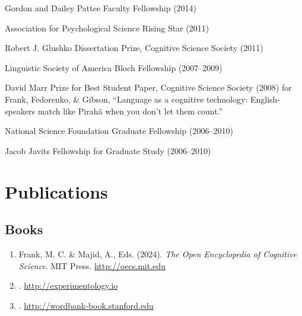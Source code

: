 \documentclass{article}
\renewenvironment{itemize}{
\begin{list}{}{
  \setlength{\leftmargin}{1.5em}
  }
  }{
\end{list}
}
\begin{document}
\begin{itemize}
  \item Gordon and Dailey Pattee Faculty Fellowship (2014)
  \item Association for Psychological Science Rising Star (2011)
  \item Robert J. Glushko Dissertation Prize, Cognitive Science Society (2011)
  \item Linguistic Society of America Bloch Fellowship (2007--2009)
  \item David Marr Prize for Best Student Paper, Cognitive Science Society (2008) for Frank, Fedorenko, \& Gibson, ``Language as a cognitive technology: English-speakers match like Pirah\~a when you don't let them count.''
  \item National Science Foundation Graduate Fellowship (2006--2010)
  \item Jacob Javits Fellowship for Graduate Study (2006--2010)
\end{itemize}

\section*{Publications}

\subsection*{Books}

\begin{enumerate}

  \item Frank, M. C. \& Majid, A., Eds. (2024). {\it The Open Encyclopedia of Cognitive Science}. MIT Press. \url{http://oecs.mit.edu}

  \item {}. \url{http://experimentology.io}

  \item {}. \url{http://wordbank-book.stanford.edu}

\end{enumerate}
\end{document}
